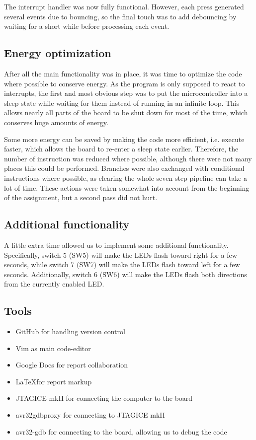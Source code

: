 The interrupt handler was now fully functional. However, each press generated several events due to bouncing, so the final touch was to add debouncing by waiting for a short while before processing each event.
\subsection{Energy optimization}

After all the main functionality was in place, it was time to optimize the code where possible to conserve energy. As the program is only supposed to react to interrupts, the first and most obvious step was to put the microcontroller into a sleep state while waiting for them instead of running in an infinite loop. This allows nearly all parts of the board to be shut down for most of the time, which conserves huge amounts of energy.

Some more energy can be saved by making the code more efficient, i.e. execute faster, which allows the board to re-enter a sleep state earlier. Therefore, the number of instruction was reduced where possible, although there were not many places this could be performed. Branches were also exchanged with conditional instructions where possible, as clearing the whole seven step pipeline can take a lot of time. These actions were taken somewhat into account from the beginning of the assignment, but a second pass did not hurt.
\subsection{Additional functionality}

A little extra time allowed us to implement some additional functionality. Specifically, switch 5 (SW5) will make the LEDs flash toward right for a few seconds, while switch 7 (SW7) will make the LEDs flash toward left for a few seconds. Additionally, switch 6 (SW6) will make the LEDs flash both directions from the currently enabled LED.
\subsection{Tools}

\begin{itemize}
\item GitHub for handling version control
\item Vim as main code-editor
\item Google Docs for report collaboration
\item \LaTeX for report markup
\item JTAGICE mkII for connecting the computer to the board
\item avr32gdbproxy for connecting to JTAGICE mkII
\item avr32-gdb for connecting to the board, allowing us to debug the code
\end{itemize}
